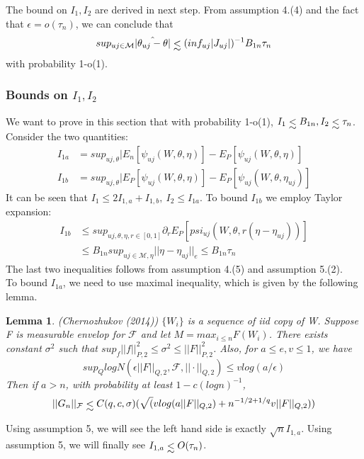 \documentclass{article}
\makeatletter
\let\originallesssim\lesssim
\DeclareRobustCommand{\lesssim}{%
  \mathrel{\mathpalette\lowersim\originallesssim}%
}
\newcommand{\lowersim}[2]{%
  \sbox\z@{$#1<$}%
  \raisebox{-\dimexpr\height-\ht\z@}{$\m@th#1#2$}%
}
\newtheorem{lemma}[theorem]{Lemma}
\makeatother
\begin{document}
The bound on $I_1,I_2$ are derived in next step. From assumption 4.(4) and the fact that $\epsilon=o(\tau_n)$, we can conclude that
\begin{equation}
    sup_{uj\in\mathcal{M}}|\hat{\theta_{uj}-\theta}|\lesssim (inf_{uj}|J_{uj}|)^{-1}B_{1n}\tau_n
\end{equation}
with probability 1-o(1).


\subsubsection{Bounds on $I_1,I_2$}
We want to prove in this section that with probability 1-o(1), $I_1\lesssim B_{1n},I_2\lesssim \tau_n$. Consider the two quantities:
\begin{align*}
    I_{1a}&=sup_{uj,\theta}|E_n[\psi_{uj}(W,\theta,\eta)]-E_P[\psi_{uj}(W,\theta,\eta)]\\
    I_{1b}&=sup_{uj,\theta}|E_P[\psi_{uj}(W,\theta,\eta)]-E_P[\psi_{uj}(W,\theta,\eta_{uj})]
\end{align*}
It can be seen that $I_1\leq 2I_{1,a}+I_{1,b},\ I_2\leq I_{1a}$. To bound $I_{1b}$ we employ Taylor expansion:
\begin{align*}
    I_{1b}&\leq sup_{uj,\theta,\eta,r\in [0,1]}\partial_r E_P[psi_{uj}(W,\theta,r(\eta-\eta_{uj}))]\\
    &\leq B_{1n}sup_{uj\in \mathcal{M},\eta}||\eta-\eta_{uj}||_e\leq B_{1n}\tau_n
\end{align*}
The last two inequalities follows from assumption 4.(5) and assumption 5.(2). \\
To bound $I_{1a}$, we need to use maximal inequality, which is given by the following lemma. 

\begin{lemma}
    (Chernozhukov (2014))\cite{Belloni_2013} $\{W_i\}$ is a sequence of iid copy of W. Suppose F is measurable envelop for $\mathcal{F}$ and let $M=max_{i\leq n}F(W_i)$. There exists constant $\sigma^2$ such that $sup_{f} ||f||^2_{P,2}\leq \sigma^2 \leq ||F||_{P,2}^2$. Also, for $a\leq e,  v \leq 1$, we have 
\begin{equation}
    sup_Q log N(\epsilon||F||_{Q,2},\mathcal{F},||\cdot||_{Q,2})\leq v log(a/\epsilon)
\end{equation}
Then if $a>n$, with probability at least $1-c(logn)^{-1}$, 
\begin{equation}
    ||G_n||_{\mathcal{F}}\lesssim C(q,c,\sigma)(\sqrt(vlog(a||F||_{Q,2})+n^{-1/2+1/q}v||F||_{Q,2}))
\end{equation}
\end{lemma}    
Using assumption 5, we will see the left hand side is exactly $\sqrt{n}I_{1,a}$. Using assumption 5, we will finally see $I_{1,a}\lesssim O(\tau_n)$.
\end{document}
